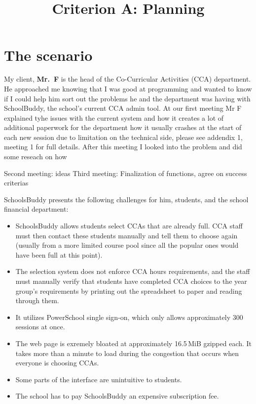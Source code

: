 

\title{Criterion A: Planning}


\maketitle

\section{The scenario}


My client, \textbf{Mr.~F} is the head of the Co-Curricular Activities
(CCA) department. He approached me knowing that I was good at programming and
wanted to know if I could help him sort out the problems he and the department
was having with SchoolBuddy, the school's current CCA admin tool.  At our first
meeting Mr F explained tyhe issues with the current system and how it
creates a lot of additional paperwork for the department how it usually crashes
at the start of each new session due to limitation on the technical side,
please see addendix 1, meeting 1 for full details.  After this meeting I looked
into the problem and did some reseach on how 

Second meeting: ideas
Third meeting: Finalization of functions, agree on success criterias

SchoolsBuddy
presents the following challenges for him, students, and the school financial
department:

\begin{itemize}
	\item SchoolsBuddy allows students select CCAs that are already full.
		CCA staff must then contact these students manually and tell
		them to choose again (usually from a more limited course pool
		since all the popular ones would have been full at this point).
	\item The selection system does not enforce CCA hours requirements, and
		the staff must manually verify that students have completed CCA
		choices to the year group's requirements by printing out the
		spreadsheet to paper and reading through them.
	\item It utilizes PowerSchool single sign-on, which only allows
		approximately 300 sessions at once.
	\item The web page is exremely bloated at approximately 16.5\,MiB
		gzipped each. It takes more than a minute to load during the
		congestion that occurs when everyone is choosing CCAs.
	\item Some parts of the interface are unintuitive to students.
	\item The school has to pay SchoolsBuddy an expensive subscription fee.
\end{itemize}

